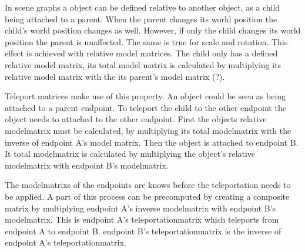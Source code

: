In scene graphs a object can be defined relative to another object, as a child being attached to a parent. When the parent changes its world position the child's world position changes as well. However, if only the child changes its world position the parent is unaffected. The same is true for scale and rotation. This effect is achieved with relative model matrices. The child only has a defined relative model matrix, its total model matrix is calculated by multiplying its relative model matrix with the its parent's model matrix (\cite{akine:2018:realtime}?).

Teleport matrices make use of this property. An object could be seen as being attached to a parent \gls{endpoint}. To teleport the child to the other endpoint the object needs to attached to the other endpoint. First the objects relative \gls{modelmatrix} must be calculated, by multiplying its total \gls{modelmatrix} with the inverse of \gls{endpoint} A's model matrix. Then the object is attached to \gls{endpoint} B. It total \gls{modelmatrix} is calculated by multiplying the object's relative \gls{modelmatrix} with \gls{endpoint} B's \gls{modelmatrix}.

The \glspl{modelmatrix} of the endpoints are knows before the teleportation needs to be applied. A part of this process can be precomputed by creating a composite matrix by multiplying \gls{endpoint} A's inverse \gls{modelmatrix} with \gls{endpoint} B's \gls{modelmatrix}. This is \gls{endpoint} A's \gls{teleportationmatrix} which teleports from \gls{endpoint} A to \gls{endpoint} B. \Gls{endpoint} B's \gls{teleportationmatrix} is the inverse of \gls{endpoint} A's \gls{teleportationmatrix}.







